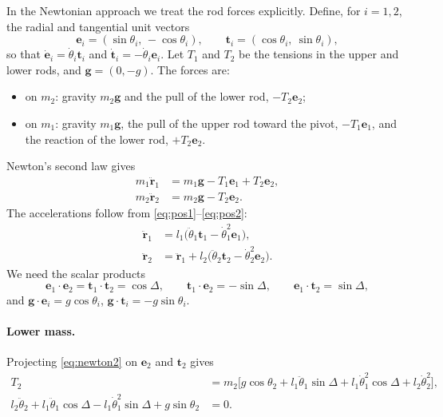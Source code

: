 \documentclass[11pt,a4paper]{book}
\theoremstyle{definition}
\theoremstyle{remark}
\begin{document}
In the Newtonian approach we treat the rod forces explicitly. Define, for $i=1,2$, the radial and tangential
unit vectors
\begin{equation}
  \bm e_i = (\sin\theta_i,\,-\cos\theta_i), \qquad
  \bm t_i = (\cos\theta_i,\ \sin\theta_i),
\end{equation}
so that $\dot{\bm e}_i=\dot\theta_i\bm t_i$ and $\dot{\bm t}_i=-\dot\theta_i\bm e_i$. Let $T_1$ and $T_2$ be the
tensions in the upper and lower rods, and $\bm g=(0,-g)$. The forces are:
\begin{itemize}
  \item on $m_2$: gravity $m_2\bm g$ and the pull of the lower rod, $-T_2\bm e_2$;
  \item on $m_1$: gravity $m_1\bm g$, the pull of the upper rod toward the pivot, $-T_1\bm e_1$, and the reaction
        of the lower rod, $+T_2\bm e_2$.
\end{itemize}
Newton's second law gives
\begin{align}
  m_1\ddot{\bm r}_1 &= m_1\bm g - T_1\bm e_1 + T_2\bm e_2, \label{eq:newton1}\\
  m_2\ddot{\bm r}_2 &= m_2\bm g - T_2\bm e_2. \label{eq:newton2}
\end{align}
The accelerations follow from \eqref{eq:pos1}--\eqref{eq:pos2}:
\begin{align}
  \ddot{\bm r}_1 &= l_1\big(\ddot\theta_1\bm t_1 - \dot\theta_1^2\bm e_1\big),\\
  \ddot{\bm r}_2 &= \ddot{\bm r}_1 + l_2\big(\ddot\theta_2\bm t_2 - \dot\theta_2^2\bm e_2\big).
\end{align}
We need the scalar products
\begin{equation}
  \bm e_1\!\cdot\!\bm e_2=\bm t_1\!\cdot\!\bm t_2=\cos\Delta,\qquad
  \bm t_1\!\cdot\!\bm e_2=-\sin\Delta,\qquad
  \bm e_1\!\cdot\!\bm t_2=\sin\Delta,
\end{equation}
and $\bm g\!\cdot\!\bm e_i=g\cos\theta_i$, $\bm g\!\cdot\!\bm t_i=-g\sin\theta_i$.

\paragraph{Lower mass.} Projecting \eqref{eq:newton2} on $\bm e_2$ and $\bm t_2$ gives
\begin{align}
  T_2 &= m_2\big[g\cos\theta_2 + l_1\ddot\theta_1\sin\Delta + l_1\dot\theta_1^2\cos\Delta + l_2\dot\theta_2^2\big],
  \label{eq:T2}\\
  l_2\ddot\theta_2 + l_1\ddot\theta_1\cos\Delta - l_1\dot\theta_1^2\sin\Delta + g\sin\theta_2 &= 0.
  \label{eq:eom2}
\end{align}
\end{document}
